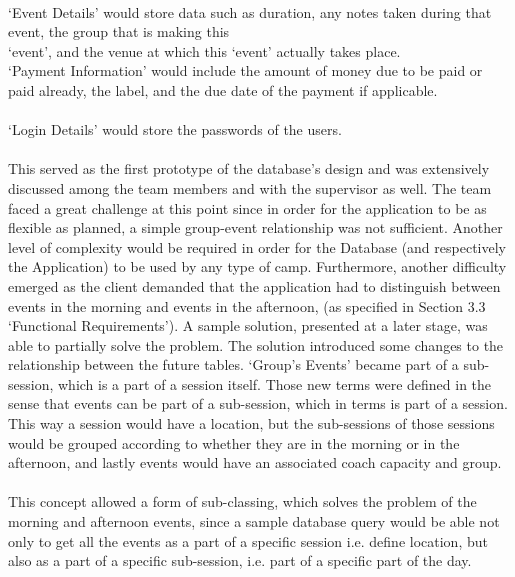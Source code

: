 \documentclass{l3proj}
\begin{document}
\\`Event Details' would store data such as duration, any notes taken during that event, the group that is making this \\`event', and the venue at which this `event' actually takes place.\\
`Payment Information' would include the amount of money due to be paid or paid already, the label, and the due date of the payment if applicable.\\
\\`Login Details' would store the passwords of the users.\\
\\This served as the first prototype of the database's design and was extensively discussed among the team members and with the supervisor as well. The team faced a great challenge at this point since in order for the application to be as flexible as planned, a simple group-event relationship was not sufficient. Another level of complexity would be required in order for the Database (and respectively the Application) to be used by any type of camp. Furthermore, another difficulty emerged as the client demanded that the application had to distinguish between events in the morning and events in the afternoon, (as specified in Section 3.3 `Functional Requirements'). A sample solution, presented at a later stage, was able to partially solve the problem. The solution introduced some changes to the relationship between the future tables. `Group's Events' became part of a sub-session, which is a part of a session itself. Those new terms were defined in the sense that events can be part of a sub-session, which in terms is part of a session. This way a session would have a location, but the sub-sessions of those sessions would be grouped according to whether they are in the morning or in the afternoon, and lastly events would have an associated coach capacity and group.\\
\\
This concept allowed a form of sub-classing, which solves the problem of the morning and afternoon events, since a sample database query would be able not only to get all the events as a part of a specific session i.e. define location, but also as a part of a specific sub-session, i.e. part of a specific part of the day.\\
\end{document}
